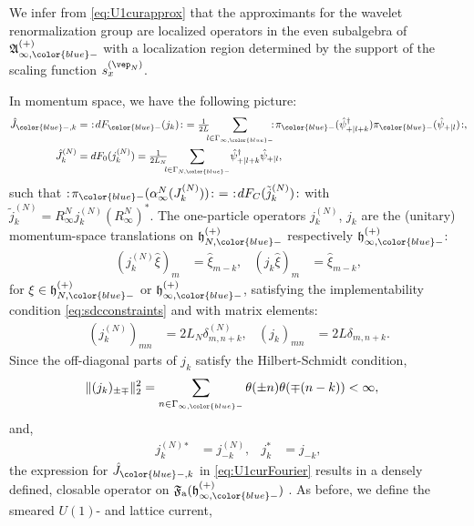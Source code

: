 \documentclass[a4paper, 11pt]{article}
\newcommand{\fA}{\mathfrak{A}}\newcommand{\cA}{\mathcal{A}}\newcommand{\dA}{\mathds{A}}\newcommand{\sA}{\mathscr{A}}
\newcommand{\ua}{\textup a}
\newcommand{\fF}{\mathfrak{F}}\newcommand{\cF}{\mathcal{F}}\newcommand{\dF}{\mathds{F}}\newcommand{\sF}{\mathscr{F}}
\newcommand{\fh}{\mathfrak{h}}
\DeclareMathOperator{\1}{\mathds{1}}
\begin{document}
We infer from \eqref{eq:U1curapprox} that the approximants for the wavelet renormalization group are localized operators in the even subalgebra of $\fA^{(+)}_{\infty,{\color{blue}-}}$ with a localization region determined by the support of the scaling function $s^{(\vep_{N})}_{x}$. 

\bigskip

In momentum space, we have the following picture:
\begin{align}
\label{eq:U1curFourier}
\hat{J}_{{\color{blue}-},k} & =\ :\!dF_{{\color{blue}-}}(j_{k})\!:\ = \tfrac{1}{2L}\!\!\!\sum_{l\in\Gamma_{\infty,{\color{blue}-}}}\!\!\!:\!\pi_{{\color{blue}-}}(\hat{\psi}^{\dag}_{+|l+k})\pi_{{\color{blue}-}}(\hat{\psi}_{+|l})\!:, \\ \nonumber
\hat{J}^{(N)}_{k} & = dF_{0}(j^{(N)}_{k}) = \tfrac{1}{2L_{N}}\!\!\!\sum_{l\in\Gamma_{N,{\color{blue}-}}}\!\hat{\psi}^{\dag}_{+|l+k}\hat{\psi}_{+|l},
\end{align}
such that $:\!\pi_{{\color{blue}-}}(\alpha^{N}_{\infty}(J^{(N)}_{k}))\!:\ =\ :\!dF_{C}(\tilde{j}^{(N)}_{k})\!:$ with $\tilde{j}^{(N)}_{k} = R^{N}_{\infty}j^{(N)}_{k}(R^{N}_{\infty})^{*}$.
The one-particle operators $j^{(N)}_{k}$, $j_{k}$ are the (unitary) momentum-space translations on $\fh^{(+)}_{N,{\color{blue}-}}$ respectively $\fh^{(+)}_{\infty,{\color{blue}-}}$:
\begin{align}
\label{eq:U1cur1p}
 (j^{(N)}_{k}\hat{\xi})_{m} & = \hat{\xi}_{m-k}, & (j_{k}\hat{\xi})_{m} & = \hat{\xi}_{m-k},
\end{align}
for $\xi\in\fh^{(+)}_{N,{\color{blue}-}}$ or $\fh^{(+)}_{\infty,{\color{blue}-}}$, satisfying the implementability condition \eqref{eq:sdcconstraints} and with matrix elements:
\begin{align}
\label{eq:U1cur1pmatrix}
(j^{(N)}_{k})_{mn} & = 2L_{N} \delta^{(N)}_{m,n+k}, & (j_{k})_{mn} & = 2L \delta_{m,n+k}.
\end{align}
Since the off-diagonal parts of $j_{k}$ satisfy the Hilbert-Schmidt condition,
\begin{align}
\label{eq:U1curimp}
\|(j_{k})_{\pm\mp}\|_{2}^{2} & = \sum_{n\in\Gamma_{\infty,{\color{blue}-}}}\theta(\pm n)\theta(\mp(n-k)) < \infty,
\end{align}
and,
\begin{align}
\label{eq:U1curadjoint}
j^{(N)}_{k}{}^{*} & = j^{(N)}_{-k}, & j_{k}^{*} & = j_{-k},
\end{align}
the expression for $\hat{J}_{{\color{blue}-},k}$ in \eqref{eq:U1curFourier} results in a densely defined, closable operator on $\fF_{\ua}(\fh^{(+)}_{\infty,{\color{blue}-}})$ \cite{CareyOnFermionGauge, EvansQuantumSymmetriesOn}. As before, we define the smeared $U(1)$- and lattice current,
\end{document}
